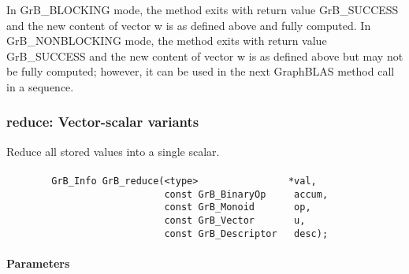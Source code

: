 In {\sf GrB\_BLOCKING} mode, the method exits with return value 
{\sf GrB\_SUCCESS} and the new content of vector {\sf w} is as defined above
and fully computed.  
In {\sf GrB\_NONBLOCKING} mode, the method exits with return value 
{\sf GrB\_SUCCESS} and the new content of vector {\sf w} is as defined above 
but may not be fully computed; however, it can be used in the next GraphBLAS 
method call in a sequence.

\subsubsection{{\sf reduce}: Vector-scalar variants}
\label{Sec:Reduce_vector_scalar}

Reduce all stored values into a single scalar.





\paragraph{\syntax}

\begin{verbatim}
        GrB_Info GrB_reduce(<type>                *val,
                            const GrB_BinaryOp     accum,
                            const GrB_Monoid       op,
                            const GrB_Vector       u,
                            const GrB_Descriptor   desc);
\end{verbatim}


\paragraph{Parameters}

